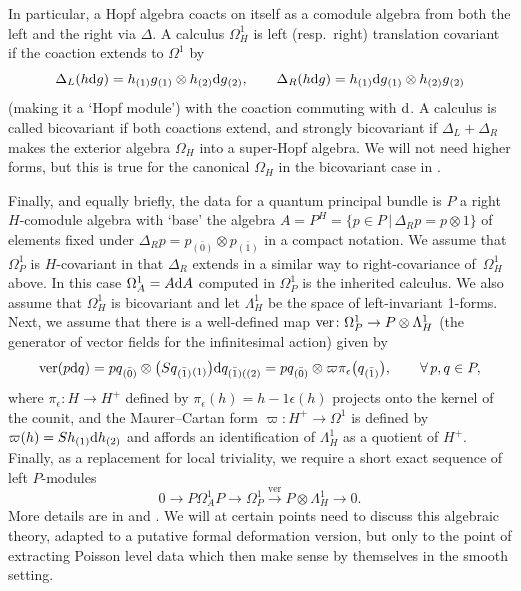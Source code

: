 \documentclass[10pt,a4paper]{amsart}
\numberwithin{equation}{section}
\newcommand{\<}{{\langle}}
\renewcommand{\>}{{\rangle}}
\newcommand{\tens}{\otimes}
\renewcommand{\o}{{}_{\scriptstyle(1)}}
\renewcommand{\t}{{}_{\scriptstyle(2)}}
\newcommand{\extd}{{\rm d}}
\newcommand{\eps}{\epsilon}
\newcommand{\co}{{}_{\scriptstyle \bar{(1)}}}
\newcommand{\rz}{{}_{\scriptstyle \bar{(0)}}}
\begin{document}
In particular, a Hopf algebra coacts on itself as a comodule algebra from both the left and the right via $\Delta$. A calculus $\Omega^1_H$ is left (resp.\ right) translation covariant if the coaction extends to $\Omega^1$ by
\[\Delta_L(h\extd g)=h\o g\o\tens h\t \extd g\t,\qquad \Delta_R(h\extd g)=h\o \extd g\o\tens h\t g\t\]
(making it a `Hopf module') with the coaction commuting with $\extd$. A calculus is called bicovariant if both coactions extend, and strongly bicovariant if $\Delta_L+\Delta_R$ makes the exterior algebra $\Omega_H$ into a super-Hopf algebra. We will not need higher forms, but this is true for the canonical $\Omega_H$ in the bicovariant case in \cite{Wor}.

Finally, and equally briefly, the data for a quantum principal bundle is $P$ a right $H$-comodule algebra with `base' the algebra $A=P^H=\{p\in P\, |\, \Delta_Rp=p\tens 1\}$ of elements fixed under $\Delta_Rp=p\rz \tens p\co $ in a compact notation. We assume that $\Omega^1_P$ is $H$-covariant in that $\Delta_R$ extends in a similar way to right-covariance of~$\Omega^1_H$ above. In this case $\Omega^1_A=A\extd A$ computed in $\Omega^1_P$ is the inherited calculus. We also assume that $\Omega^1_H$ is bicovariant and let $\Lambda^1_H$ be the space of left-invariant 1-forms. Next, we assume that there is a well-defined map ${\rm ver}\colon \Omega^1_P\to P\tens \Lambda^1_H$ (the generator of vector fields for the infinitesimal action) given by
\begin{equation}\label{PHver} \text{ver}(p\extd q)=pq\rz \tens\big(Sq\co\o \big)\extd q_{\bar{(1)}((2)}=pq\rz\tens\varpi \pi_\eps\big(q\co\big), \qquad \forall\, p,q\in P, \end{equation}
where $\pi_\eps\colon H\to H^+$ defined by $\pi_\eps(h)=h-1\eps(h)$ projects onto the kernel of the counit, and the Maurer--Cartan form $\varpi \colon H^+\to \Omega^1$ is defined by $\varpi (h)=Sh\o\extd h\t$ and affords an identification of $\Lambda^1_H$ as a quotient of $H^+$. Finally, as a replacement for local triviality, we require a short exact sequence of left $P$-modules
\begin{equation}\label{PHexact} 0\longrightarrow P\Omega^1_AP\longrightarrow \Omega^1_P\xrightarrow{\text{ver}}P\tens\Lambda^1_H\longrightarrow 0. \end{equation}
More details are in \cite{BrzMa, Ma:spin} and \cite[Chapter~5]{BegMa}. We will at certain points need to discuss this algebraic theory, adapted to a putative formal deformation version, but only to the point of extracting Poisson level data which then make sense by themselves in the smooth setting.
\end{document}
